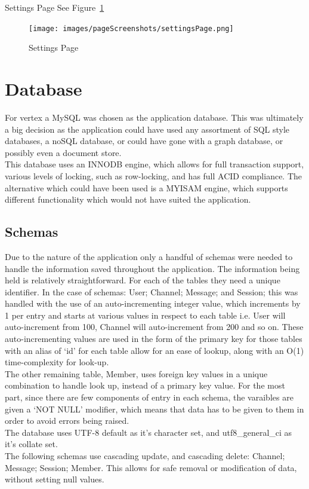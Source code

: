 Settings Page See Figure~\ref{image:settingsPage}
\begin{figure}[h!]
    \caption{Settings Page}
    \label{image:settingsPage}
    \centering
    \texttt{[image: images/pageScreenshots/settingsPage.png]}
\end{figure}


\section{Database}
For vertex a MySQL was chosen as the application database. This was ultimately a big decision as the application could have used any assortment of SQL style databases, a noSQL database, or could have gone with a graph database, or possibly even a document store.
\\ This database uses an INNODB engine, which allows for full transaction support, various levels of locking, such as row-locking, and has full ACID compliance. The alternative which could have been used is a MYISAM engine, which supports different functionality which would not have suited the application.

\subsection{Schemas}
Due to the nature of the application only a handful of schemas were needed to handle the information saved throughout the application. The information being held is relatively straightforward. For each of the tables they need a unique identifier. In the case of schemas: User; Channel; Message; and Session; this was handled with the use of an auto-incrementing integer value, which increments by 1 per entry and starts at various values in respect to each table i.e. User will auto-increment from 100, Channel will auto-increment from 200 and so on. These auto-incrementing values are used in the form of the primary key for those tables with an alias of ‘id’ for each table allow for an ease of lookup, along with an O(1) time-complexity for look-up.
\\ The other remaining table, Member, uses foreign key values in a unique combination to handle look up, instead of a primary key value. For the most part, since there are few components of entry in each schema, the varaibles are given a ‘NOT NULL’ modifier, which means that data has to be given to them in order to avoid errors being raised.
\\ The database uses UTF-8 default as it’s character set, and utf8\_general\_ci as it’s collate set.
\\ The following schemas use cascading update, and cascading delete: Channel; Message; Session; Member. This allows for safe removal or modification of data, without setting null values.

